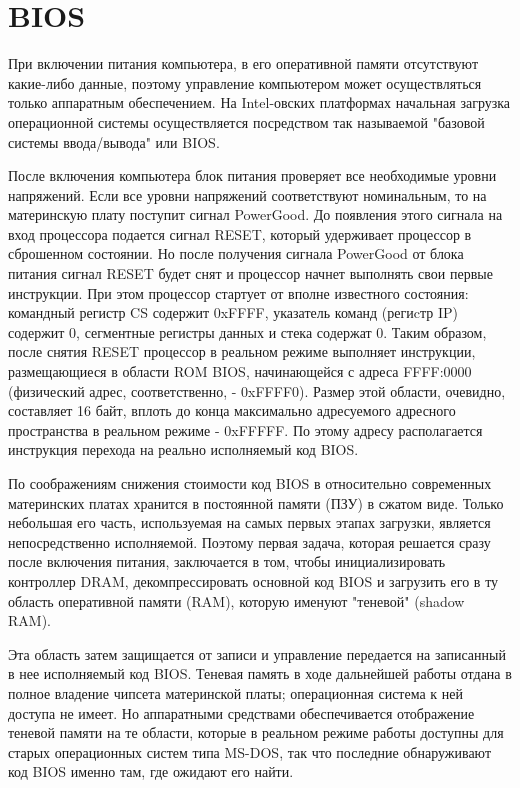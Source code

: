 \newpage
\section{BIOS}

При включении питания компьютера, в его оперативной памяти отсутствуют какие-либо данные, поэтому управление компьютером может осуществляться только аппаратным обеспечением. На Intel-овских платформах начальная загрузка операционной системы осуществляется посредством так называемой "базовой системы ввода/вывода" или BIOS.

После включения компьютера блок питания проверяет все необходимые уровни напряжений. Если все уровни напряжений соответствуют номинальным, то на материнскую плату поступит сигнал PowerGood. До появления этого сигнала на вход процессора подается сигнал RESET, который удерживает процессор в сброшенном состоянии. Но после получения сигнала PowerGood от блока питания сигнал RESET будет снят и процессор начнет выполнять свои первые инструкции. При этом процессор стартует от вполне известного состояния: командный регистр CS содержит 0xFFFF, указатель команд (региcтр IP) содержит 0, сегментные регистры данных и стека содержат 0. Таким образом, после снятия RESET процессор в реальном режиме выполняет инструкции, размещающиеся в области ROM BIOS, начинающейся с адреса FFFF:0000 (физический адрес, соответственно, - 0xFFFF0). Размер этой области, очевидно, составляет 16 байт, вплоть до конца максимально адресуемого адресного пространства в реальном режиме - 0xFFFFF. По этому адресу располагается инструкция перехода на реально исполняемый код BIOS.

По соображениям снижения стоимости код BIOS в относительно современных материнских платах хранится в постоянной памяти (ПЗУ) в сжатом виде. Только небольшая его часть, используемая на самых первых этапах загрузки, является непосредственно исполняемой. Поэтому первая задача, которая решается сразу после включения питания, заключается в том, чтобы инициализировать контроллер DRAM, декомпрессировать основной код BIOS и загрузить его в ту область оперативной памяти (RAM), которую именуют "теневой" (shadow RAM).

Эта область затем защищается от записи и управление передается на записанный в нее исполняемый код BIOS. Теневая память в ходе дальнейшей работы отдана в полное владение чипсета материнской платы; операционная система к ней доступа не имеет. Но аппаратными средствами обеспечивается отображение теневой памяти на те области, которые в реальном режиме работы доступны для старых операционных систем типа MS-DOS, так что последние обнаруживают код BIOS именно там, где ожидают его найти.

